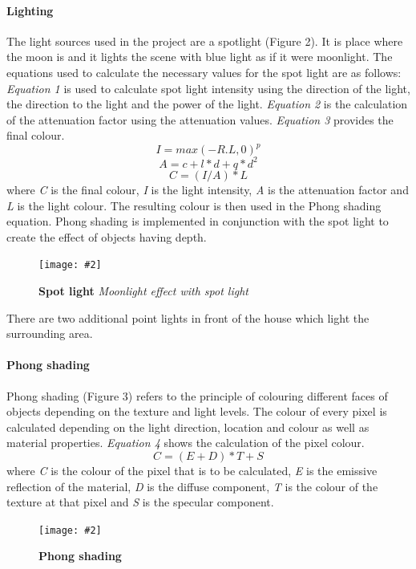 \documentclass[10pt, a4paper]{article}
\newcommand{\figuremacro}[5]{
    \begin{figure}[#1]
        \centering
        \texttt{[image: \#2]}
        \caption[#3]{\textbf{#3}#4}
        \label{fig:#2}
    \end{figure}
}
\begin{document}
    \paragraph{Lighting}
    The light sources used in the project are a spotlight (Figure 2). It is place where the moon is and it lights the scene with blue light as if it were moonlight. The equations used to calculate the necessary values for the spot light are as follows:
    \textit{Equation 1} is used to calculate spot light intensity using the direction of the light, the direction to the light and the power of the light.
    \textit{Equation 2} is the calculation of the attenuation factor using the attenuation values.
    \textit{Equation 3} provides the final colour.
    \begin{equation}
    I =  max(-R . L, 0)^p
    \end{equation}
    \begin{equation}
    A =  c + l * d + q*d^2
    \end{equation}
    \begin{equation}
    C = (I / A) * L
    \end{equation}
    where \textit{C} is the final colour, \textit{I} is the light intensity, \textit{A} is the attenuation factor and \textit{L} is the light colour. The resulting colour is then used in the Phong shading equation. Phong shading is implemented in conjunction with the spot light to create the effect of objects having depth.
    \figuremacro{h}{light.png}{Spot light}{ \textit{Moonlight effect with spot light} }{1.0}
    There are two additional point lights in front of the house which light the surrounding area.

    \paragraph{Phong shading}
    Phong shading (Figure 3) refers to the principle of colouring different faces of objects depending on the texture and light levels. The colour of every pixel is calculated depending on the light direction, location and colour as well as material properties.
    \textit{Equation 4} shows the calculation of the pixel colour.
    \begin{equation}
    C = (E + D) * T + S
    \end{equation}
    where \textit{C} is the colour of the pixel that is to be calculated, \textit{E} is the emissive reflection of the material, \textit{D} is the diffuse component, \textit{T} is the colour of the texture at that pixel and \textit{S} is the specular component.
    \figuremacro{h}{phong.png}{Phong shading}{ }{1.0}
\end{document}
